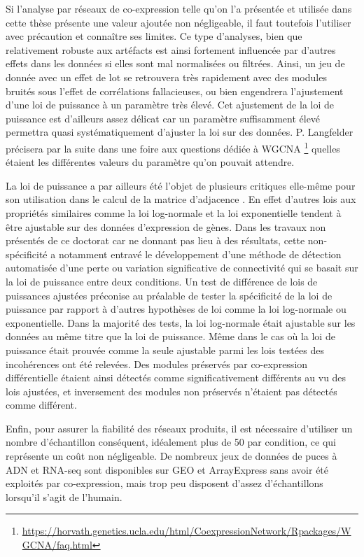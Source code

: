 Si l'analyse par réseaux de co-expression telle qu'on l'a présentée et utilisée dans cette thèse présente une valeur ajoutée non négligeable, il faut toutefois l'utiliser avec précaution et connaître ses limites. Ce type d'analyses, bien que relativement robuste aux artéfacts est ainsi fortement influencée par d'autres effets dans les données si elles sont mal normalisées ou filtrées. Ainsi, un jeu de donnée avec un effet de lot se retrouvera très rapidement avec des modules bruités sous l'effet de corrélations fallacieuses, ou bien engendrera l'ajustement d'une loi de puissance à un paramètre très élevé. Cet ajustement de la loi de puissance est d'ailleurs assez délicat car un paramètre suffisamment élevé permettra quasi systématiquement d'ajuster la loi sur des données. P. Langfelder précisera par la suite dans une foire aux questions dédiée à WGCNA \footnote{\url{https://horvath.genetics.ucla.edu/html/CoexpressionNetwork/Rpackages/WGCNA/faq.html}} quelles étaient les différentes valeurs du paramètre qu'on pouvait attendre. 

La loi de puissance a par ailleurs été l'objet de plusieurs critiques elle-même pour son utilisation dans le calcul de la matrice d'adjacence \cite{Broido2019Mar}. En effet d'autres lois aux propriétés similaires comme la loi log-normale et la loi exponentielle tendent à être ajustable sur des données d'expression de gènes. Dans les travaux non présentés de ce doctorat car ne donnant pas lieu à des résultats, cette non-spécificité a notamment entravé le développement d'une méthode de détection automatisée d'une perte ou variation significative de connectivité qui se basait sur la loi de puissance entre deux conditions. Un test de différence de lois de puissances ajustées préconise au préalable de tester la spécificité de la loi de puissance par rapport à d'autres hypothèses de loi comme la loi log-normale ou exponentielle. Dans la majorité des tests, la loi log-normale était ajustable sur les données au même titre que la loi de puissance. Même dans le cas où la loi de puissance était prouvée comme la seule ajustable parmi les lois testées des incohérences ont été relevées. Des modules préservés par co-expression différentielle étaient ainsi détectés comme significativement différents au vu des lois ajustées, et inversement des modules non préservés n'étaient pas détectés comme différent.

Enfin, pour assurer la fiabilité des réseaux produits, il est nécessaire d'utiliser un nombre d'échantillon conséquent, idéalement plus de 50 par condition, ce qui représente un coût non négligeable. De nombreux jeux de données de puces à ADN et RNA-seq sont disponibles sur GEO et ArrayExpress sans avoir été exploités par co-expression, mais trop peu disposent d'assez d'échantillons lorsqu'il s'agit de l'humain. 



